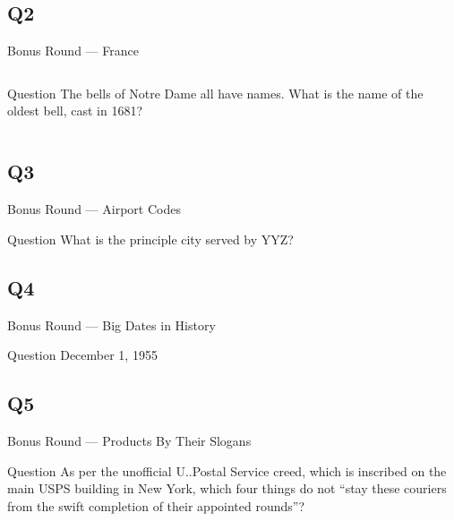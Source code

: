 \documentclass[11pt]{beamer}
\begin{document}
\subsection*{Q2}
\begin{frame}[t]{Bonus Round --- France}
\begin{columns}[T,totalwidth=\linewidth]
\begin{column}{0.32\linewidth}
\begin{block}{Question}
The bells of Notre Dame all have names.  What is the name of the oldest bell, cast in 1681?
\end{block}
\end{column}
\begin{column}{0.65\linewidth}
\begin{center}
\texttt{[image: \{Images/emannuelbell]}.jpg}
\end{center}
\end{column}
\end{columns}
\end{frame}
\subsection*{Q3}
\begin{frame}[t]{Bonus Round --- Airport Codes}
\begin{block}{Question}
What is the principle city served by YYZ\@?
\end{block}
\end{frame}
\subsection*{Q4}
\begin{frame}[t]{Bonus Round --- Big Dates in History}
\begin{block}{Question}
December 1, 1955
\end{block}
\end{frame}
\subsection*{Q5}
\begin{frame}[t]{Bonus Round --- Products By Their Slogans}
\begin{block}{Question}
As per the unofficial U.\@S.\@ Postal Service creed, which is inscribed on the main USPS building in New York, which four things do not ``stay these couriers from the swift completion of their appointed rounds''?
\end{block}
\end{frame}
\end{document}
